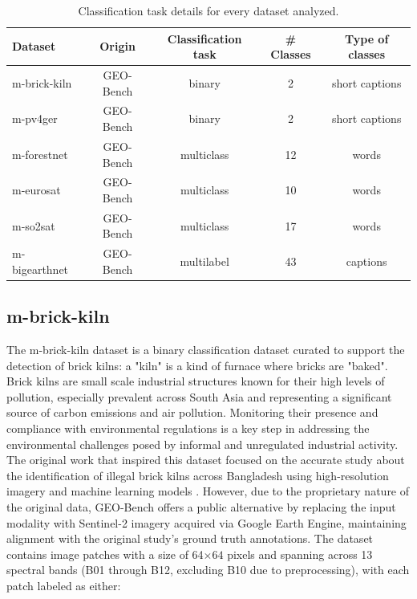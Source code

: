 \documentclass[a4paper, twoside, english]{sapthesis} %
\begin{document}
\begin{table}[h]
\centering
\footnotesize
\renewcommand{\arraystretch}{1.2}
    \begin{tabular}{lcccc}
    \toprule
    \textbf{Dataset} & \textbf{Origin} & \textbf{Classification task} & \textbf{\# Classes} & \textbf{Type of classes}  \\
    \midrule
    m-brick-kiln & GEO-Bench & binary & 2 & short captions \\
    m-pv4ger & GEO-Bench & binary & 2 & short captions \\
    m-forestnet & GEO-Bench & multiclass & 12 & words \\
    m-eurosat & GEO-Bench & multiclass & 10 & words \\
    m-so2sat & GEO-Bench & multiclass & 17 & words \\
    m-bigearthnet & GEO-Bench & multilabel & 43 & captions \\
    \bottomrule
    \end{tabular}
\vspace{0.3cm}
\caption{\normalsize Classification task details for every dataset analyzed.}
\label{tab:geoclasstypes}
\end{table}

\subsection{m-brick-kiln}

The m-brick-kiln dataset is a binary classification dataset curated to support the detection of brick kilns: a "kiln" is a kind of furnace where bricks are "baked". Brick kilns are small scale industrial structures known for their high levels of pollution, especially prevalent across South Asia and representing a significant source of carbon emissions and air pollution. Monitoring their presence and compliance with environmental regulations is a key step in addressing the environmental challenges posed by informal and unregulated industrial activity.
The original work that inspired this dataset focused on the accurate study about the identification of illegal brick kilns across Bangladesh using high-resolution imagery and machine learning models \cite{lee2021scalable}. However, due to the proprietary nature of the original data, GEO-Bench offers a public alternative by replacing the input modality with Sentinel-2 imagery acquired via Google Earth Engine, maintaining alignment with the original study’s ground truth annotations.
The dataset contains image patches with a size of 64$\times64$ pixels and spanning across 13 spectral bands (B01 through B12, excluding B10 due to preprocessing), with each patch labeled as either:
\end{document}
